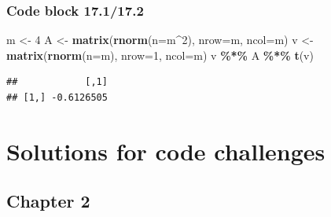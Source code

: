 \documentclass[
]{book}
\newenvironment{Shaded}{\begin{snugshade}}{\end{snugshade}}
\newcommand{\DataTypeTok}[1]{\textcolor[rgb]{0.13,0.29,0.53}{#1}}
\newcommand{\DecValTok}[1]{\textcolor[rgb]{0.00,0.00,0.81}{#1}}
\newcommand{\KeywordTok}[1]{\textcolor[rgb]{0.13,0.29,0.53}{\textbf{#1}}}
\newcommand{\NormalTok}[1]{#1}
\newcommand{\OperatorTok}[1]{\textcolor[rgb]{0.81,0.36,0.00}{\textbf{#1}}}
\newcommand{\StringTok}[1]{\textcolor[rgb]{0.31,0.60,0.02}{#1}}
\begin{document}
\hypertarget{code-block-17.117.2}{%
\subsection*{Code block 17.1/17.2}\label{code-block-17.117.2}}

\begin{Shaded}
\begin{Highlighting}[]
\NormalTok{m \textless{}{-}}\StringTok{ }\DecValTok{4}
\NormalTok{A \textless{}{-}}\StringTok{ }\KeywordTok{matrix}\NormalTok{(}\KeywordTok{rnorm}\NormalTok{(}\DataTypeTok{n=}\NormalTok{m}\OperatorTok{\^{}}\DecValTok{2}\NormalTok{), }\DataTypeTok{nrow=}\NormalTok{m, }\DataTypeTok{ncol=}\NormalTok{m)}
\NormalTok{v \textless{}{-}}\StringTok{ }\KeywordTok{matrix}\NormalTok{(}\KeywordTok{rnorm}\NormalTok{(}\DataTypeTok{n=}\NormalTok{m), }\DataTypeTok{nrow=}\DecValTok{1}\NormalTok{, }\DataTypeTok{ncol=}\NormalTok{m)}
\NormalTok{v }\OperatorTok{\%*\%}\StringTok{ }\NormalTok{A }\OperatorTok{\%*\%}\StringTok{ }\KeywordTok{t}\NormalTok{(v)}
\end{Highlighting}
\end{Shaded}

\begin{verbatim}
##            [,1]
## [1,] -0.6126505
\end{verbatim}

\hypertarget{solutions-for-code-challenges}{%
\chapter*{Solutions for code challenges}\label{solutions-for-code-challenges}}

\hypertarget{chapter-2-1}{%
\section*{Chapter 2}\label{chapter-2-1}}
\end{document}
